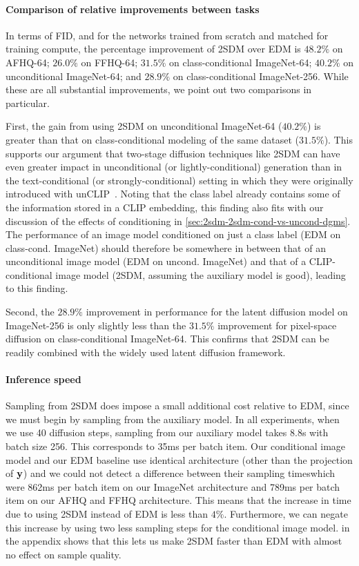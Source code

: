 \paragraph{Comparison of relative improvements between tasks}
In terms of FID, and for the networks trained from scratch and matched for training compute, the percentage improvement of 2SDM over EDM is $48.2\%$ on AFHQ-64; $26.0\%$ on FFHQ-64; $31.5\%$ on class-conditional ImageNet-64; $40.2\%$ on unconditional ImageNet-64; and $28.9\%$ on class-conditional ImageNet-256. While these are all substantial improvements, we point out two comparisons in particular. 

First, the gain from using 2SDM on unconditional ImageNet-64 ($40.2\%$) is greater than that on class-conditional modeling of the same dataset ($31.5\%$). This supports our argument that two-stage diffusion techniques like 2SDM can have even greater impact in unconditional (or lightly-conditional) generation than in the text-conditional (or strongly-conditional) setting in which they were originally introduced with unCLIP~\citep{ramesh2022hierarchical}.  Noting that the class label already contains some of the information stored in a CLIP embedding, this finding also fits with our discussion of the effects of conditioning in \cref{sec:2sdm-2sdm-cond-vs-uncond-dgms}. The performance of an image model conditioned on just a class label (EDM on class-cond. ImageNet) should therefore be somewhere in between that of an unconditional image model (EDM on uncond. ImageNet) and that of a CLIP-conditional image model (2SDM, assuming the auxiliary model is good), leading to this finding.

Second, the $28.9\%$ improvement in performance for the latent diffusion model on ImageNet-256 is only slightly less than the $31.5\%$ improvement for pixel-space diffusion on class-conditional ImageNet-64. This confirms that 2SDM can be readily combined with the widely used latent diffusion framework.

\paragraph{Inference speed}
Sampling from 2SDM does impose a small additional cost relative to EDM, since we must begin by sampling from the auxiliary model. In all experiments, when we use 40 diffusion steps, sampling from our auxiliary model takes 8.8s with batch size 256. This corresponds to 35ms per batch item. Our conditional image model and our EDM baseline use identical architecture (other than the projection of ${\mathbf{y}}$) and we could not detect a difference between their sampling timeswhich were 862ms per batch item on our ImageNet architecture and 789ms per batch item on our AFHQ and FFHQ architecture. This means that the increase in time due to using 2SDM instead of EDM is less than $4\%$. Furthermore, we can negate this increase by using two less sampling steps for the conditional image model.  in the appendix shows that this lets us make 2SDM faster than EDM with almost no effect on sample quality.

